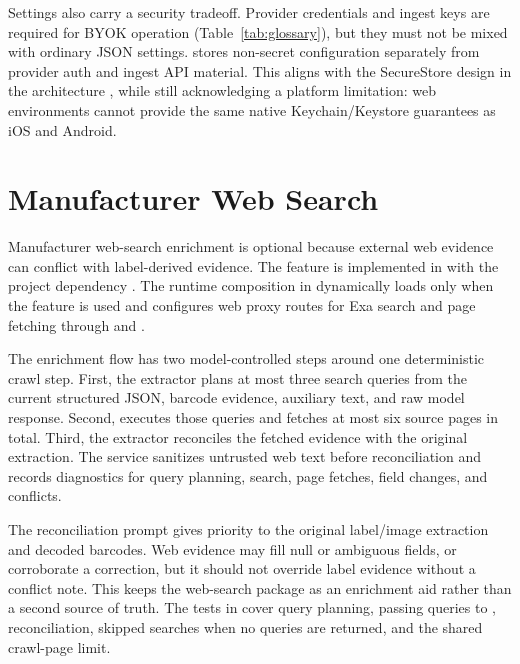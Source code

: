 Settings also carry a security tradeoff. Provider credentials and ingest keys are required for BYOK operation (Table~\ref{tab:glossary}), but they must not be mixed with ordinary JSON settings.  stores non-secret configuration separately from provider auth and ingest API material. This aligns with the SecureStore design in the architecture \cite{expo-securestore}, while still acknowledging a platform limitation: web environments cannot provide the same native Keychain/Keystore guarantees as iOS and Android.

\section{Manufacturer Web Search}

Manufacturer web-search enrichment is optional because external web evidence can conflict with label-derived evidence. The feature is implemented in  with the project dependency . The runtime composition in  dynamically loads  only when the feature is used and configures web proxy routes for Exa search and page fetching through  and .

The enrichment flow has two model-controlled steps around one deterministic crawl step. First, the extractor plans at most three search queries from the current structured JSON, barcode evidence, auxiliary text, and raw model response. Second,  executes those queries and fetches at most six source pages in total. Third, the extractor reconciles the fetched evidence with the original extraction. The service sanitizes untrusted web text before reconciliation and records diagnostics for query planning, search, page fetches, field changes, and conflicts.

The reconciliation prompt gives priority to the original label/image extraction and decoded barcodes. Web evidence may fill null or ambiguous fields, or corroborate a correction, but it should not override label evidence without a conflict note. This keeps the web-search package as an enrichment aid rather than a second source of truth. The tests in  cover query planning, passing queries to , reconciliation, skipped searches when no queries are returned, and the shared crawl-page limit.


